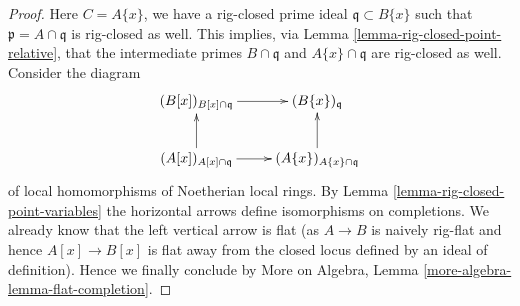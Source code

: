 \documentclass[10pt,a4paper]{amsart}
\theoremstyle{plain}
\theoremstyle{definition}
\theoremstyle{remark}
\numberwithin{equation}{subsection}
\begin{document}
\begin{proof}
\medskip\noindent
Here $C = A\{x\}$, we have a rig-closed prime ideal
$\mathfrak q \subset B\{x\}$ such that
$\mathfrak p = A \cap \mathfrak q$ is rig-closed as well.
This implies, via Lemma \ref{lemma-rig-closed-point-relative},
that the intermediate primes $B \cap \mathfrak q$ and
$A\{x\} \cap \mathfrak q$ are rig-closed as well.
Consider the diagram
$$
\xymatrix{
(B[x])_{B[x] \cap \mathfrak q} \ar[r] &
(B\{x\})_{\mathfrak q} \\
(A[x])_{A[x] \cap \mathfrak q} \ar[r] \ar[u] &
(A\{x\})_{A\{x\} \cap \mathfrak q} \ar[u]
}
$$
of local homomorphisms of Noetherian local rings.
By Lemma \ref{lemma-rig-closed-point-variables}
the horizontal arrows define isomorphisms
on completions. We already know that the left
vertical arrow is flat (as $A \to B$ is naively rig-flat
and hence $A[x] \to B[x]$ is flat away from the
closed locus defined by an ideal of definition).
Hence we finally conclude by
More on Algebra, Lemma \ref{more-algebra-lemma-flat-completion}.
\end{proof}
\end{document}
